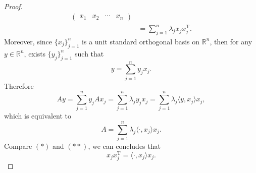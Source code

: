 \documentclass[12pt]{article}
\renewcommand{\(}{\left(}%
\renewcommand{\)}{\right)}%
\renewcommand{\[}{\left[}%
\renewcommand{\]}{\right]}%
\renewcommand{\r}{\mathbb{R}}
\newtheorem{proof}{Proof.}}
\begin{document}
\begin{proof}
\begin{equation*}
\begin{split}
  		\begin{pmatrix}
  		x_1 & x_2 & \cdots & x_n
  	\end{pmatrix}\\
  	&=\sum_{j=1}^n \lambda_j x_jx_j^\mathrm{T}.
  		\end{split}\tag{$*$}
  	\end{equation*}
  	Moreover, since $\{x_j\}_{j=1}^n$ is a unit standard orthogonal basis on $\r^n$, then for any $y\in\r^n$, exists $\{y_j\}_{j=1}^n$ such that
   \begin{equation*}
   	y=\sum_{j=1}^n y_jx_j.
   \end{equation*}
   Therefore
   \begin{equation*}
   	Ay=\sum_{j=1}^n y_jAx_j=\sum_{j=1}^n \lambda_j y_j x_j=\sum_{j=1}^n \lambda_j \langle y,x_j\rangle x_j,
   \end{equation*}
   which is equivalent to
   \begin{equation*}
   	A=\sum_{j=1}^n \lambda_j \langle \cdot,x_j\rangle x_j.\tag{$**$}
   \end{equation*}
   Compare $(*)$ and $(**)$, we can concludes that
   \begin{equation*}
   	x_jx_j^\mathrm{T}=\langle \cdot,x_j\rangle x_j.
   \end{equation*}
  \end{proof}
  
\end{document}
